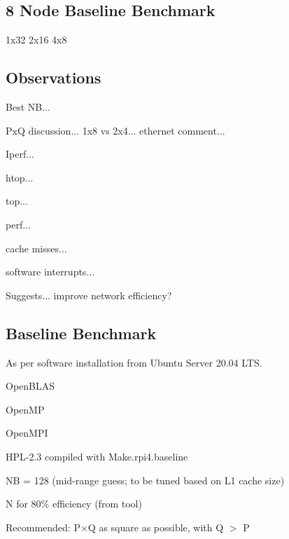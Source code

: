 \documentclass{article}
\begin{document}


\subsection{8 Node Baseline Benchmark}

1x32
2x16
4x8




\subsection{Observations}

Best NB...

PxQ discussion... 1x8 vs 2x4... ethernet comment...

Iperf...

htop...

top...

perf...

cache misses...

software interrupts...

Suggests... improve network efficiency?



%
%



\subsection{Baseline Benchmark}
As per software installation from Ubuntu Server 20.04 LTS.

OpenBLAS

OpenMP

OpenMPI

HPL-2.3 compiled with Make.rpi4.baseline

NB = 128 (mid-range guess; to be tuned based on L1 cache size)

N for 80\% efficiency (from tool)

Recommended: P$\times$Q as square as possible, with Q $>$ P
\end{document}
